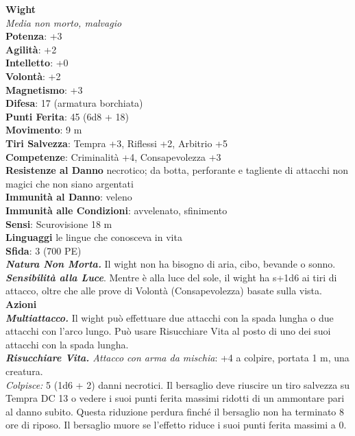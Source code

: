 \begin{multicols}{2}
\medskip\textbf{Wight}\\
\emph{Media non morto, malvagio}\\
\textbf{Potenza}: +3\\
\textbf{Agilità}: +2\\
\textbf{Intelletto}: +0\\
\textbf{Volontà}: +2\\
\textbf{Magnetismo}: +3\\
\textbf{Difesa}: 17 (armatura borchiata)\\
\textbf{Punti Ferita}: 45 (6d8 + 18)\\
\textbf{Movimento}: 9 m\\
\textbf{Tiri Salvezza}: Tempra +3, Riflessi +2, Arbitrio +5\\
\textbf{Competenze}: Criminalità +4, Consapevolezza +3\\
\textbf{Resistenze al Danno} necrotico; da botta, perforante e tagliente di attacchi non magici che non siano argentati \\
\textbf{Immunità al Danno}: veleno\\
\textbf{Immunità alle Condizioni}: avvelenato, sfinimento\\
\textbf{Sensi}: Scurovisione 18 m\\
\textbf{Linguaggi} le lingue che conosceva in vita\\
\textbf{Sfida}: 3 (700 PE)\smallskip\\
\emph{\textbf{Natura Non Morta.}} Il wight non ha bisogno di aria, cibo, bevande o sonno.\\
\emph{\textbf{Sensibilità alla Luce}}. Mentre è alla luce del sole, il wight ha s+1d6 ai tiri di attacco, oltre che alle prove di Volontà (Consapevolezza) basate sulla vista.\\
\smallskip\textbf{Azioni}\\
\emph{\textbf{Multiattacco.}} Il wight può effettuare due attacchi con la spada lungha o due attacchi con l'arco lungo. Può usare Risucchiare Vita al posto di uno dei suoi attacchi con la spada lungha.\\
\emph{\textbf{Risucchiare Vita.} Attacco con arma da mischia}: +4 a colpire, portata 1 m, una creatura.\\
\emph{Colpisce:} 5 (1d6 + 2) danni necrotici. Il bersaglio deve riuscire un tiro salvezza su Tempra DC 13 o vedere i suoi punti ferita massimi ridotti di un ammontare pari al danno subito. Questa riduzione perdura finché il bersaglio non ha terminato 8 ore di riposo. Il bersaglio muore se l'effetto riduce i suoi punti ferita massimi a 0.\\


\end{multicols}
